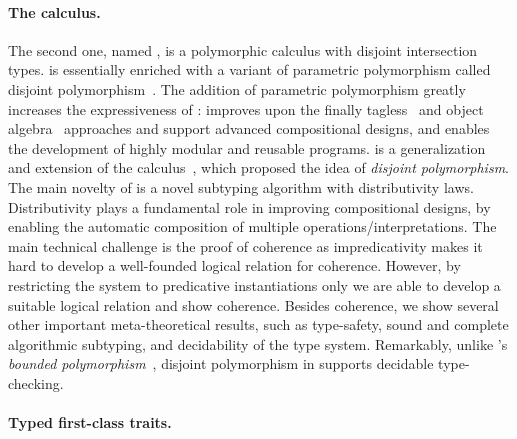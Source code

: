 \paragraph{The \fnamee calculus.}

The second one, named \fnamee, is a polymorphic calculus with disjoint
intersection types. \fnamee is essentially \namee enriched with a variant of
parametric polymorphism called disjoint polymorphism~\citep{alpuimdisjoint}. The
addition of parametric polymorphism greatly increases the expressiveness of
\namee: \fnamee improves upon the finally tagless~\citep{CARETTE_2009} and
object algebra~\citep{oliveira2012extensibility} approaches and support advanced
compositional designs, and enables the development of highly modular and
reusable programs. \fnamee is a generalization and extension of the
\fname calculus~\citep{alpuimdisjoint}, which proposed the idea of
\emph{disjoint polymorphism}. The main novelty of \fnamee is a novel subtyping
algorithm with distributivity laws. Distributivity plays a fundamental
role in improving compositional designs, by enabling the automatic composition
of multiple operations/interpretations. The main technical challenge is the
proof of coherence as impredicativity makes it hard to develop a
well-founded logical relation for coherence. However, by restricting the system
to predicative instantiations only we are able to develop a suitable logical
relation and show coherence. Besides coherence, we show several other important
meta-theoretical results, such as type-safety, sound and complete algorithmic
subtyping, and decidability of the type system. Remarkably, unlike \fsub's
\emph{bounded polymorphism}~\citep{cardelli1985understanding}, disjoint polymorphism in \fnamee supports decidable
type-checking.



\paragraph{Typed first-class traits.}

